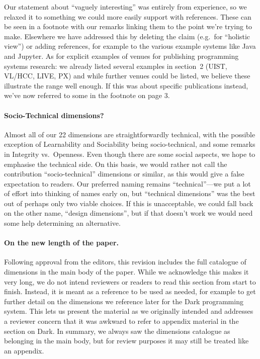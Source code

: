 Our statement about ``vaguely interesting'' was entirely from
experience, so we relaxed it to something we could more easily support
with references. These can be seen in a footnote with our remarks
linking them to the point we're trying to make. Elsewhere we have
addressed this by deleting the claim (e.g.~for ``holistic view'') or
adding references, for example to the various example systems like Java
and Jupyter. As for explicit examples of venues for publishing
programming systems research: we already listed several examples in
section~2 (UIST, VL/HCC, LIVE, PX) and while further venues could be
listed, we believe these illustrate the range well enough. If this was
about specific publications instead, we've now referred to some in the
footnote on page 3.

\paragraph{Socio-Technical dimensions?}

Almost all of our 22 dimensions are straightforwardly technical, with
the possible exception of Learnability and Sociability being
socio-technical, and some remarks in Integrity vs.~Openness. Even though
there are some social aspects, we hope to emphasise the technical side.
On this basis, we would rather not call the contribution
``socio-technical'' dimensions or similar, as this would give a false
expectation to readers. Our preferred naming remains ``technical''---we
put a lot of effort into thinking of names early on, but ``technical
dimensions'' was the best out of perhaps only two viable choices. If
this is unacceptable, we could fall back on the other name, ``design
dimensions'', but if that doesn't work we would need some help
determining an alternative.

\paragraph{On the new length of the paper.}

Following approval from the editors, this revision includes the full
catalogue of dimensions in the main body of the paper. While we
acknowledge this makes it very long, we do not intend reviewers or
readers to read this section from start to finish. Instead, it is meant
as a reference to be used as needed, for example to get further detail
on the dimensions we reference later for the Dark programming system.
This lets us present the material as we originally intended and
addresses a reviewer concern that it was awkward to refer to appendix
material in the section on Dark. In summary, we always saw the
dimensions catalogue as belonging in the main body, but for review
purposes it may still be treated like an appendix.
